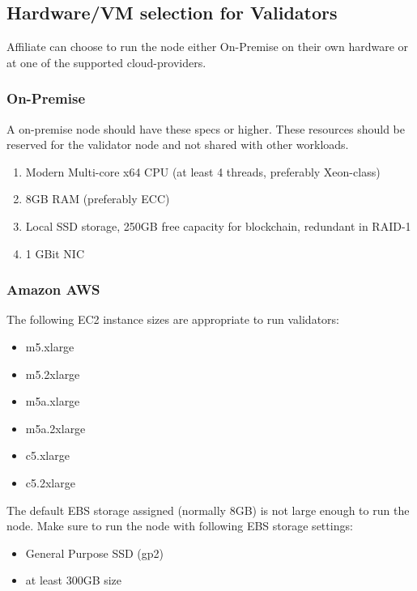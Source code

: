 \subsection{Hardware/VM selection for Validators}

Affiliate can choose to run the node either On-Premise on their own hardware or at one of the supported cloud-providers.

\subsubsection{On-Premise}

A on-premise node should have these specs or higher. These resources should be reserved for the validator node and not shared with other workloads.

\begin{enumerate}
    \item Modern Multi-core x64 CPU (at least 4 threads, preferably Xeon-class)
    \item 8GB RAM (preferably ECC)
    \item Local SSD storage, 250GB free capacity for blockchain, redundant in RAID-1
    \item 1 GBit NIC
\end{enumerate}

\subsubsection{Amazon AWS}

The following EC2 instance sizes are appropriate to run validators:

\begin{itemize}
    \item m5.xlarge
    \item m5.2xlarge
    \item m5a.xlarge
    \item m5a.2xlarge
    \item c5.xlarge
    \item c5.2xlarge
\end{itemize}

The default EBS storage assigned (normally 8GB) is not large enough to run the node. Make sure to run the node with following EBS storage settings:
\begin{itemize}
    \item General Purpose SSD (gp2)
    \item at least 300GB size
\end{itemize}


